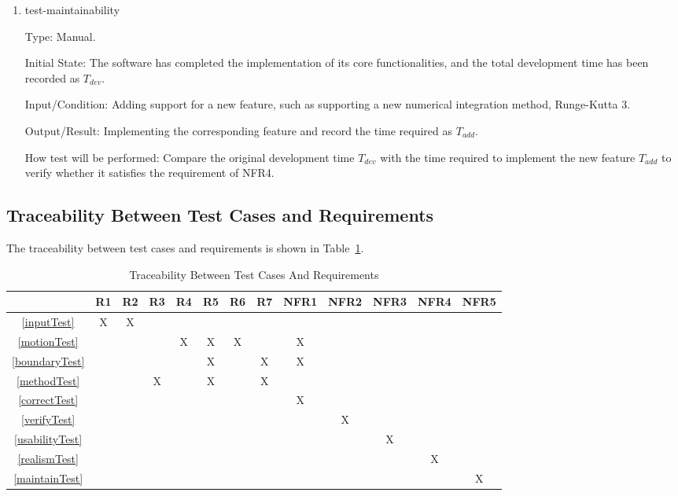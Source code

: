 \documentclass[12pt, titlepage]{article}
\begin{document}
\begin{enumerate}

\item{test-maintainability\\} 

Type: Manual.
					
Initial State: The software has completed the implementation of its
core functionalities, and the total development time has been recorded
as $T_{dev}$.
					
Input/Condition: Adding support for a new feature, such as supporting
a new numerical integration method, Runge-Kutta 3.
					
Output/Result: Implementing the corresponding feature and record
the time required as $T_{add}$.
					
How test will be performed: Compare the original development time $T_{dev}$ with 
the time required to implement the new feature $T_{add}$ to verify whether it 
satisfies the requirement of NFR4.

\end{enumerate}

\subsection{Traceability Between Test Cases and Requirements} \label{secTrace}

The traceability between test cases and requirements is shown in Table~\ref{tblTrace}.

\begin{table}[h!]
\caption{Traceability Between Test Cases And Requirements} \label{tblTrace} 
\centering
\begin{tabular}{|c|c|c|c|c|c|c|c|c|c|c|c|c|}
\hline
	& R1 & R2 & R3 & R4 & R5 & R6 & R7 & NFR1 & NFR2 & NFR3 & NFR4 & NFR5 \\
\hline
\ref{inputTest}                &X&X& & & & & & & & & & \\ \hline
\ref{motionTest}               & & & &X&X&X& &X& & & & \\ \hline
\ref{boundaryTest}             & & & & &X& &X&X& & & & \\ \hline
\ref{methodTest}               & & &X& &X& &X& & & & & \\ \hline
\ref{correctTest}              & & & & & & & &X& & & & \\ \hline
\ref{verifyTest}               & & & & & & & & &X& & & \\ \hline
\ref{usabilityTest}            & & & & & & & & & &X& & \\ \hline
\ref{realismTest}              & & & & & & & & & & &X& \\ \hline
\ref{maintainTest}             & & & & & & & & & & & &X\\ \hline
\end{tabular}
\end{table}
\end{document}
